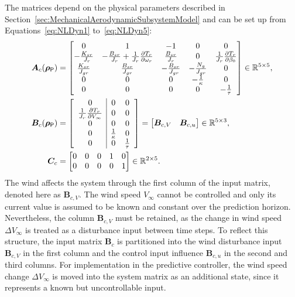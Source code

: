 The matrices depend on the physical parameters described in Section~\ref{sec:MechanicalAerodynamicSubsystemModel} and can be set up from Equations~\eqref{eq:NLDyn1} to~\eqref{eq:NLDyn5}:
\begin{equation}
    \begin{aligned}
        \bm{A}_c(\bm{\rho}_{\mathsf{P}}) &=
        \begin{bmatrix}
            0  & 1 & -1 & 0 & 0 \\ 
            -\frac{K_{sr}}{J_r}  & -\frac{B_{sr}}{J_r} + \frac{1}{J_r}\frac{\partial T_r}{\partial{\omega_r}} & \frac{B_{sr}}{J_r} & 0 & \frac{1}{J_r}\frac{\partial T_r}{\partial \beta_0} \\
            \frac{K_{sr}}{J_{gr}} & \frac{B_{sr}}{J_{gr}} & -\frac{B_{sr}}{J_{gr}} & -\frac{N_g}{J_{gr}} & 0 \\ 
            0 & 0 & 0 & -\frac{1}{\kappa} & 0 \\ 
            0 & 0 & 0 & 0 & -\frac{1}{\tau} 
        \end{bmatrix} \in \mathbb{R}^{5 \times 5},\\
        \bm{B}_c(\bm{\rho}_{\mathsf{P}}) &=
        \left[
        \begin{array}{c|cc}
            0 & 0 & 0 \\
            \frac{1}{J_r}\frac{\partial T_r}{\partial V_{\infty}} & 0 & 0 \\
            0 & 0 & 0 \\
            0 & \frac{1}{\kappa} & 0 \\
            0 & 0 & \frac{1}{\tau}
        \end{array}
        \right]
        =
        \begin{bmatrix}
            \bm{B}_{c,V} & \bm{B}_{c,u}
        \end{bmatrix}
        \in \mathbb{R}^{5 \times 3},\\
        \bm{C}_c &=
        \begin{bmatrix}
            0 & 0 & 0 & 1 & 0 \\
            0 & 0 & 0 & 0 & 1
        \end{bmatrix} \in \mathbb{R}^{2 \times 5}.
    \end{aligned}
\end{equation}
%
The wind affects the system through the first column of the input matrix, denoted here as $\bm{B}_{c,V}$. The wind speed $V_{\infty}$ cannot be controlled and only its current value is assumed to be known and constant over the prediction horizon. Nevertheless, the column $\bm{B}_{c,V}$ must be retained, as the change in wind speed $\Delta V_{\infty}$ is treated as a disturbance input between time steps. To reflect this structure, the input matrix $\bm{B}_c$ is partitioned into the wind disturbance input $\bm{B}_{c,V}$ in the first column and the control input influence $\bm{B}_{c,u}$ in the second and third columns. For implementation in the predictive controller, the wind speed change $\Delta V_{\infty}$ is moved into the system matrix as an additional state, since it represents a known but uncontrollable input.

